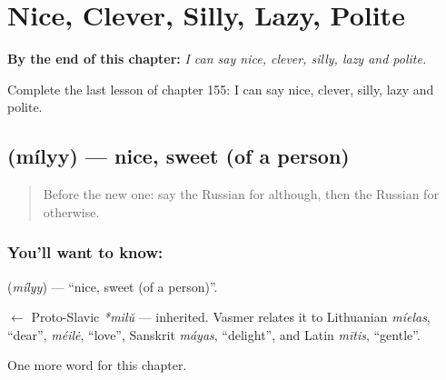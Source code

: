 
\chapter{Nice, Clever, Silly, Lazy, Polite}
\label{ch:ru-nice-clever-silly-lazy-polite}

\begin{chapteropening}
\textbf{By the end of this chapter:} \emph{I can say nice, clever, silly, lazy and polite.}

Complete the last lesson of chapter 155: I can say nice, clever, silly, lazy and polite.
\end{chapteropening}

\section[\texorpdfstring{\ru{милый} (mílyy)}{милый (mílyy)}]{ (mílyy) — nice, sweet (of a person)}

\label{lesson:RU-C155-milyy}



\begin{quote}
Before the new one: say the Russian for although, then the Russian for otherwise.
\end{quote}

\subsection*{You'll want to know: }
\textbf{} (\emph{mílyy}) — \textquotedblleft{}nice, sweet (of a person)\textquotedblright{}.

\begin{cousinweb}
\textbf{} $\leftarrow$ Proto-Slavic \emph{*milŭ} — inherited. Vasmer relates it to Lithuanian \emph{míelas}, \textquotedblleft{}dear\textquotedblright{}, \emph{méilė}, \textquotedblleft{}love\textquotedblright{}, Sanskrit \emph{máyas}, \textquotedblleft{}delight\textquotedblright{}, and Latin \emph{mītis}, \textquotedblleft{}gentle\textquotedblright{}.
\end{cousinweb}

\begin{grammarlens}[title={What you've built}]
One more word for this chapter.
\end{grammarlens}

